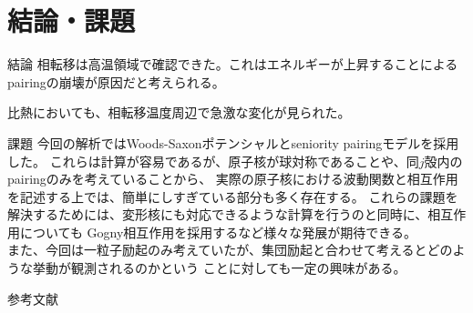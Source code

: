 \documentclass[aspectratio=169, 12pt, dvipdfmx]{beamer}
\begin{document}
\section{結論・課題}

\begin{frame}{結論}
  相転移は高温領域で確認できた。これはエネルギーが上昇することによるpairingの崩壊が原因だと考えられる。
  \par
  比熱においても、相転移温度周辺で急激な変化が見られた。
  
\end{frame}

\begin{frame}{課題}
  今回の解析ではWoods-Saxonポテンシャルとseniority pairingモデルを採用した。
  これらは計算が容易であるが、原子核が球対称であることや、同$j$殻内のpairingのみを考えていることから、
  実際の原子核における波動関数と相互作用を記述する上では、簡単にしすぎている部分も多く存在する。
  これらの課題を解決するためには、変形核にも対応できるような計算を行うのと同時に、相互作用についても
  Gogny相互作用を採用するなど様々な発展が期待できる。\\
  また、今回は一粒子励起のみ考えていたが、集団励起と合わせて考えるとどのような挙動が観測されるのかという
  ことに対しても一定の興味がある。

\end{frame}

\begin{frame}{参考文献}
  
  
\end{frame}
\end{document}
